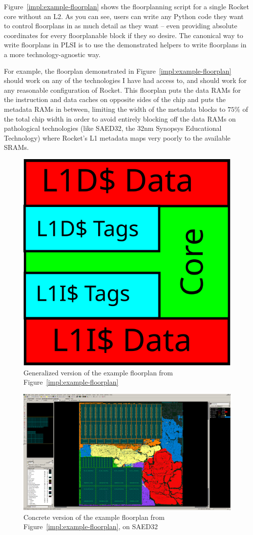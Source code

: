 \documentclass{article}
\begin{document}
Figure~\ref{impl:example-floorplan} shows the floorplanning script for a single
Rocket core without an L2.  As you can see, users can write any Python code
they want to control floorplans in as much detail as they want -- even
providing absolute coordinates for every floorplanable block if they so desire.
The canonical way to write floorplans in PLSI is to use the demonstrated
helpers to write floorplans in a more technology-agnostic way.

For example, the floorplan demonstrated in Figure~\ref{impl:example-floorplan}
should work on any of the technologies I have had access to, and should work
for any reasonable configuration of Rocket.  This floorplan puts the data RAMs
for the instruction and data caches on opposite sides of the chip and puts the
metadata RAMs in between, limiting the width of the metadata blocks to $75\%$
of the total chip width in order to avoid entirely blocking off the data RAMs
on pathological technologies (like SAED32, the 32nm Synopsys Educational
Technology) where Rocket's L1 metadata maps very poorly to the available SRAMs.

\begin{figure}
  \begin{center}
    \includegraphics[width=0.333\linewidth]{figures/rocket-floorplan-general.svg}
  \end{center}
  \caption{Generalized version of the example floorplan from Figure~\ref{impl:example-floorplan}}
  \label{impl:example-floorplan-output}
\end{figure}

\begin{figure}
  \begin{center}
    \includegraphics[width=0.95\linewidth]{figures/icc-rocket.png}
  \end{center}
  \caption{Concrete version of the example floorplan from Figure~\ref{impl:example-floorplan}, on SAED32}
  \label{impl:example-floorplan-saed32}
\end{figure}
\end{document}
